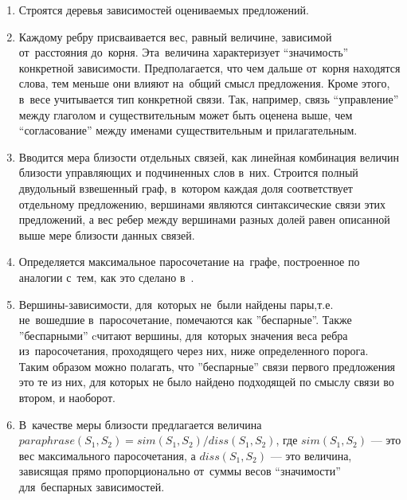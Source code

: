 \begin{enumerate}

\item {
Строятся деревья зависимостей оцениваемых предложений.
}

\item {
Каждому ребру присваивается вес, равный величине,  
зависимой от~расстояния до~корня. 
Эта~величина характеризует ``значимость'' конкретной зависимости.
Предполагается, что чем дальше от~корня находятся слова, тем меньше они влияют на~общий смысл предложения. 
Кроме этого, в~весе учитывается тип конкретной связи.
Так, например, связь ``управление'' между глаголом и существительным 
может быть оценена выше, чем ``согласование'' между именами существительным и прилагательным.
}

\item{
Вводится мера близости отдельных связей, как линейная комбинация
величин близости управляющих и подчиненных слов в~них.
Строится полный двудольный взвешенный граф, в~котором каждая доля соответствует отдельному предложению,
вершинами являются синтаксические связи этих предложений,
а вес ребер между вершинами разных долей равен описанной выше мере близости
данных связей.
}

\item {
Определяется максимальное паросочетание на~графе,
построенное по аналогии с~тем, как это сделано в~\cite{wordnetSim}.
}

\item {
Вершины-зависимости, для~которых не~были найдены пары,т.е. не~вошедшие в~паросочетание, 
помечаются как ''беспарные''.
Также ''беспарными'' cчитают вершины,  для~которых значения веса ребра из~паросочетания, 
проходящего через них, ниже определенного порога.
Таким образом можно полагать, что ''беспарные'' связи первого предложения это те из них,
для которых не было найдено подходящей по смыслу связи во втором, и наоборот. 
}

\item{
В~качестве меры близости предлагается величина 
$paraphrase(S_1, S_2) = sim(S_1,S_2)/diss(S_1, S_2)$, 
где $sim(S_1, S_2)$ --- это вес максимального паросочетания,
а $diss(S_1, S_2)$ --- это величина, зависящая прямо пропорционально  
от~суммы весов ``значимости'' для~беспарных зависимостей.
}

\end{enumerate}

